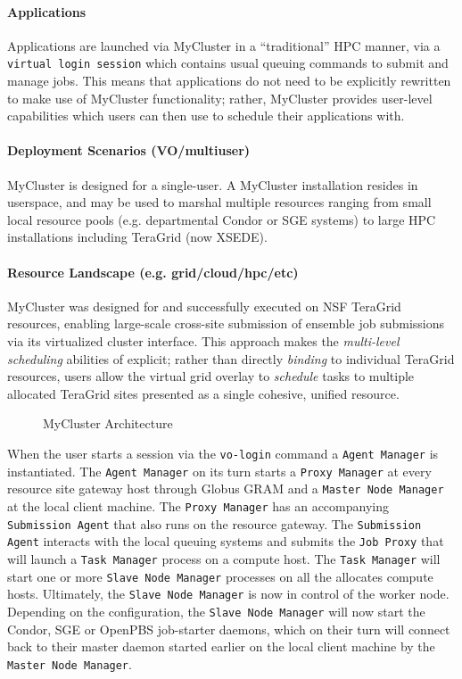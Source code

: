 \documentclass{sig-alternate}
\begin{document}
\paragraph{Applications}
Applications are launched via MyCluster in a ``traditional''
HPC manner, via a \texttt{virtual
login session} which contains usual queuing commands to submit
and manage jobs.  This means that applications do not need
to be explicitly rewritten to make use of MyCluster functionality;
rather, MyCluster provides user-level \pilotjob capabilities
which users can then use to schedule their applications with.

\paragraph{Deployment Scenarios (VO/multiuser)}
MyCluster is designed for a single-user.  A MyCluster
installation resides in userspace, and may be used
to marshal multiple resources ranging from small local resource pools
(e.g. departmental Condor or SGE systems) to large HPC installations
including TeraGrid (now XSEDE).

\paragraph{Resource Landscape (e.g. grid/cloud/hpc/etc)}
MyCluster was designed for and successfully executed on NSF TeraGrid
resources, enabling large-scale cross-site submission of ensemble
job submissions via its virtualized cluster interface.
This approach makes the \textit{multi-level scheduling} abilities
of \pilotjobs explicit; rather than directly \textit{binding}
to individual TeraGrid resources, users allow the virtual grid
overlay to \textit{schedule} tasks to multiple allocated TeraGrid sites
presented as a single cohesive, unified resource.

\begin{figure}[t]
    \centering
    \caption{MyCluster Architecture}
    \label{fig:mycluster_arch}
\end{figure}

When the user starts a session via the \texttt{vo-login} command a
\texttt{Agent Manager} is instantiated.
The \texttt{Agent Manager} on its turn starts a \texttt{Proxy Manager} at every
resource site gateway host through Globus GRAM and a \texttt{Master Node
Manager} at the local client machine.
The \texttt{Proxy Manager} has an accompanying \texttt{Submission Agent} that
also runs on the resource gateway.
The \texttt{Submission Agent} interacts with the local queuing systems and
submits the \texttt{Job Proxy} that will launch a \texttt{Task Manager} process
on a compute host.
The \texttt{Task Manager} will start one or more \texttt{Slave Node Manager}
processes on all the allocates compute hosts.
Ultimately, the \texttt{Slave Node Manager} is now in control of the worker
node.
Depending on the configuration, the \texttt{Slave Node Manager} will now start
the Condor, SGE or OpenPBS job-starter daemons, which on their turn will
connect back to their master daemon started earlier on the local client
machine by the \texttt{Master Node Manager}.
\end{document}
